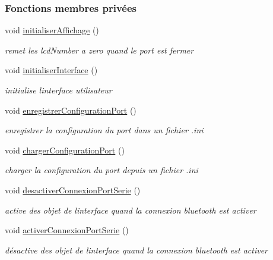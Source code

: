 \subsubsection*{Fonctions membres privées}
\begin{DoxyCompactItemize}
\item 
void \hyperlink{class_ihm_a9bd8f55d47f658fa5311b7880cc94114}{initialiser\+Affichage} ()
\begin{DoxyCompactList}\small\item\em remet les lcd\+Number a zero quand le port est fermer \end{DoxyCompactList}\item 
void \hyperlink{class_ihm_a3c6fa78360d39cf904dc3a20b0347ddc}{initialiser\+Interface} ()
\begin{DoxyCompactList}\small\item\em initialise l\textquotesingle{}interface utilisateur \end{DoxyCompactList}\item 
void \hyperlink{class_ihm_a05afaf2191aaae673c5ecd14a6d1c921}{enregistrer\+Configuration\+Port} ()
\begin{DoxyCompactList}\small\item\em enregistrer la configuration du port dans un fichier .ini \end{DoxyCompactList}\item 
void \hyperlink{class_ihm_a7341abb08452b21ef2e5c8cb5095d5b0}{charger\+Configuration\+Port} ()
\begin{DoxyCompactList}\small\item\em charger la configuration du port depuis un fichier .ini \end{DoxyCompactList}\item 
void \hyperlink{class_ihm_a3c792f8eeef5216e76cdb9d9e13eb1aa}{desactiver\+Connexion\+Port\+Serie} ()
\begin{DoxyCompactList}\small\item\em active des objet de l\textquotesingle{}interface quand la connexion bluetooth est activer \end{DoxyCompactList}\item 
void \hyperlink{class_ihm_a58ae5ccbff166bcb6723db14a9cf04d9}{activer\+Connexion\+Port\+Serie} ()
\begin{DoxyCompactList}\small\item\em désactive des objet de l\textquotesingle{}interface quand la connexion bluetooth est activer \end{DoxyCompactList}\item 

\end{DoxyCompactItemize}
